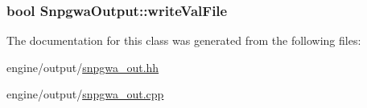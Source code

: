 \label{classSnpgwaOutput_aaaf80792184004da79d3fd9f06b800d2}
\hypertarget{classSnpgwaOutput_a92dbf1675db0fadf2123a8161df7e75c}{
\subsubsection[{writeValFile}]{\setlength{\rightskip}{0pt plus 5cm}bool {\bf SnpgwaOutput::writeValFile}}}
\label{classSnpgwaOutput_a92dbf1675db0fadf2123a8161df7e75c}


The documentation for this class was generated from the following files:\begin{DoxyCompactItemize}
\item 
engine/output/\hyperlink{snpgwa__out_8hh}{snpgwa\_\-out.hh}\item 
engine/output/\hyperlink{snpgwa__out_8cpp}{snpgwa\_\-out.cpp}\end{DoxyCompactItemize}
